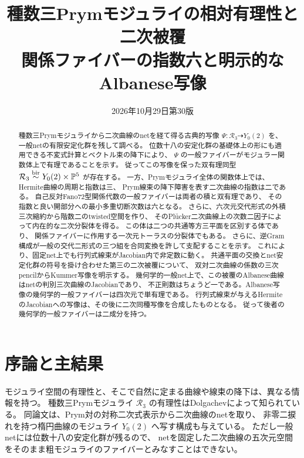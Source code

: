 
\title{種数三Prymモジュライの相対有理性と\\二次被覆\\[.4em]
\large 関係ファイバーの指数六と明示的なAlbanese写像}
\author{}\date{2026年10月29日\quad 第30版}

\maketitle
\begin{abstract}
種数三Prymモジュライから二次曲線のnetを経て得る古典的写像
$\Psi:\mathcal R_3\dashrightarrow Y_0(2)$ を、一般netの有限安定化群を残して調べる。
位数十八の安定化群の基礎体上の形にも適用できる不変式計算とベクトル束の降下により、
$\Psi$ の一般ファイバーがモジュラー関数体上で有理であることを示す。
従ってこの写像を保った双有理同型
$\mathcal R_3\mathrel{\overset{\mathrm{bir}}{\sim}} Y_0(2)\times\mathbb P^5$ が存在する。
一方、Prymモジュライ全体の関数体上では、Hermite曲線の周期と指数は三、
Prym線束の降下障害を表す二次曲線の指数は二である。
自己反対Fano72型関係代数の一般ファイバーは両者の積と双有理であり、
その指数と良い開部分への最小多重切断次数は六となる。
さらに、六次元交代形式の外積三次縮約から階数二のtwisted空間を作り、
そのPl\"ucker二次曲線上の次数二因子によって内在的な二次分裂体を得る。
この体は二つの共通等方三平面を区別する体であり、
関係ファイバーに作用する一次元トーラスの分裂体でもある。
さらに、逆Gram構成が一般の交代二形式の三つ組を合同変換を許して支配することを示す。
これにより、固定net上でも行列式線束がJacobian内で非定数に動く。
共通平面の交換とnet安定化群の符号を掛け合わせた第三の二次被覆について、
双対二次曲線の係数の三次pencilからKummer写像を明示する。
幾何学的一般net上で、この被覆のAlbanese曲線はnetの判別三次曲線のJacobianであり、
不正則数はちょうど一である。Albanese写像の幾何学的一般ファイバーは四次元で単有理である。
行列式線束が与えるHermiteのJacobianへの写像は、その後に二次同種写像を合成したものとなる。
従って後者の幾何学的一般ファイバーは二成分を持つ。
\end{abstract}
\begingroup\small\setlength{\parskip}{0pt}\tableofcontents\endgroup

\section{序論と主結果}

モジュライ空間の有理性と、そこで自然に定まる曲線や線束の降下は、異なる情報を持つ。
種数三Prymモジュライ $\mathcal R_3$ の有理性はDolgachev\cite{DolgachevRationality2008}によって知られている。
同論文は、Prym対の対称二次式表示から二次曲線のnetを取り、
非零二捩れを持つ楕円曲線のモジュライ $Y_0(2)$ へ写す構成も与えている。
ただし一般netには位数十八の安定化群が残るので、
netを固定した二次曲線の五次元空間をそのまま粗モジュライのファイバーとみなすことはできない。

